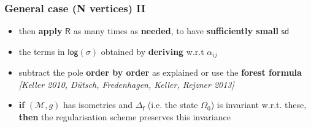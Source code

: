 \documentclass[9pt]{beamer}
\newcommand{\logar}{\mathsf{log}} %
\newcommand{\sd}{\mathsf{sd}} %
\newcommand{\citebeam}[1]{\textit{\textcolor{black!60!white}{[#1]}}} %
\newcommand{\Mcal}{\mathcal{M}}
\newcommand{\Rsf}{\mathsf{R}}
\newcommand{\fsf}{\mathsf{f}}
\newcommand{\tsf}{\mathsf{t}}
\begin{document}
\begin{frame}
 
\frametitle{General case (N vertices) II}

\begin{itemize}
 
\item then \textbf{apply} $\Rsf$ as many times as \textbf{needed}, to have \textbf{sufficiently small} $\sd$ 

\item the terms in $\logar(\sigma)$ obtained by \textbf{deriving} w.r.t $\alpha_{ij}$

\item subtract the pole \textbf{order by order} as explained or use the \textbf{forest formula} \\
\citebeam{Keller 2010, Dütsch, Fredenhagen, Keller, Rejzner 2013}

\item \textbf{if} $(\Mcal,g)$ has isometries and $\Delta_\fsf$ (i.e. the state $\Omega_0$) is invariant w.r.t. these, \textbf{then} the regularisation scheme preserves this invariance
 
\end{itemize}




\end{frame}







\end{document}
